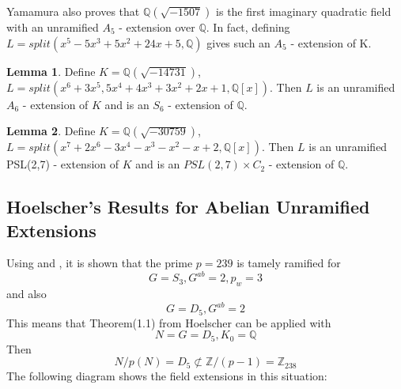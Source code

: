 \documentclass[12pt]{extarticle}
\newcommand{\Q}{\mathbb{Q}}
\newcommand{\Z}{\mathbb{Z}}
\newcommand{\<}{\langle}
\renewcommand{\>}{\rangle}
\theoremstyle{definition}
\newtheorem{lemma}{Lemma}
\begin{document}
Yamamura \cite{YAMA1997} also proves that $\Q(\sqrt{-1507})$ is the first imaginary quadratic field with an unramified $A_5$ - extension over $\Q$. In fact, defining $L=split\left( x^5-5x^3+5x^2+24x+5,\Q\right)$ gives such an $A_5$ - extension of K. 
\begin{lemma}
Define $K=\Q(\sqrt{-14731})$, $L=split(x^6+3x^5,5x^4+4x^3+3x^2+2x+1,\Q[x])$. Then $L$ is an unramified $A_6$ - extension of $K$ and is an $S_6$ - extension of $\Q$.
\end{lemma}
\begin{lemma}
Define $K=\Q(\sqrt{-30759})$, $L=split(x^7+2x^6-3x^4-x^3-x^2-x+2,\Q[x])$. Then $L$ is an unramified PSL(2,7) - extension of $K$ and is an $PSL(2,7)\times C_2$ - extension of $\Q$.
\end{lemma}

\subsection{Hoelscher's Results for Abelian Unramified Extensions}
Using \cite{HOEL} and \cite{JONE}, it is shown that 
the prime $p=239$ is tamely ramified for 
\begin{equation}
  G=S_3, G^{ab} = 2, p_w =3  
\end{equation} and also 
\begin{equation}
    G=D_5,G^{ab} = 2 
\end{equation}
This means that Theorem(1.1) from Hoelscher can be applied \cite{HOEL} with
\begin{equation}
    N = G = D_5, K_0 = \Q
\end{equation}
Then 
\begin{equation}
N/p(N) = D_5 \not\subset \Z/(p-1) = \Z_{238}
\end{equation}
The following diagram shows the field extensions in this situation: 
\begin{center}
    
\end{center}
\end{document}

